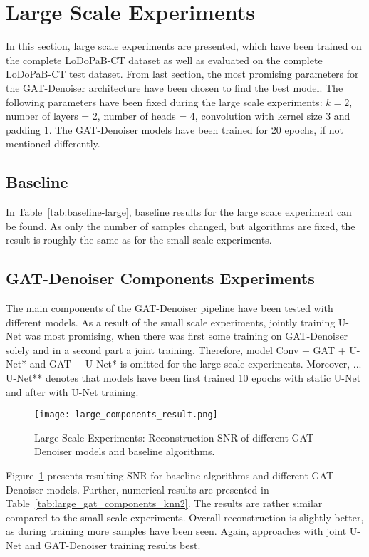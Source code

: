 \section{Large Scale Experiments}

In this section, large scale experiments are presented, which have been trained on the complete LoDoPaB-CT dataset
as well as evaluated on the complete LoDoPaB-CT test dataset.
From last section, the most promising parameters for the GAT-Denoiser architecture have been chosen
to find the best model. The following parameters have been fixed during the large scale experiments:
$k=2$, number of layers = 2, number of heads = 4, convolution with kernel size 3 and padding 1.
The GAT-Denoiser models have been trained for 20 epochs, if not mentioned differently.


\subsection{Baseline}
In Table~\ref{tab:baseline-large}, baseline results for the large scale experiment can be found.
As only the number of samples changed, but algorithms are fixed, the result is roughly 
the same as for the small scale experiments.

\subsection{GAT-Denoiser Components Experiments}
The main components of the GAT-Denoiser pipeline have been tested with different models.
As a result of the small scale experiments, jointly training U-Net was most promising, 
when there was first some training on GAT-Denoiser solely and in a second part a joint training.
Therefore, model {Conv + GAT + U-Net*} and {GAT + U-Net*} is omitted for the large scale experiments.
Moreover, {... U-Net**} denotes that models have been first trained 10 epochs with
static U-Net and after with U-Net training.


\begin{figure}[H]
  \centering
  \texttt{[image: large\_components\_result.png]}
  \caption{Large Scale Experiments: Reconstruction SNR of different GAT-Denoiser models and baseline algorithms.}
  \label{fig:large_components}
\end{figure}

Figure~\ref{fig:large_components} presents resulting SNR for baseline algorithms and 
different GAT-Denoiser models. Further, numerical results are presented in Table~\ref{tab:large_gat_components_knn2}.
The results are rather similar compared to the small scale experiments.
Overall reconstruction is slightly better, as during training more samples have been seen.
Again, approaches with joint U-Net and GAT-Denoiser training results best.

